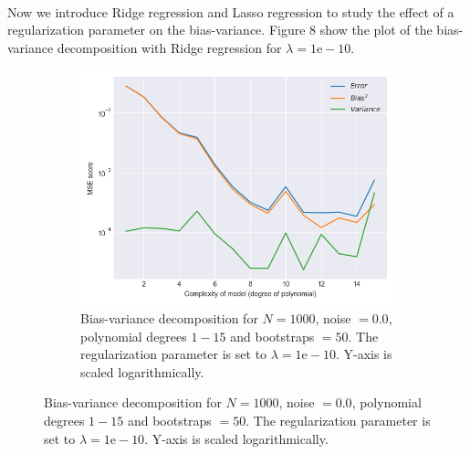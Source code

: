 \documentclass[a4paper,twocolumn]{article}
\begin{document}
\\
Now we introduce Ridge regression and Lasso regression to study the effect of a regularization parameter on the bias-variance. Figure 8 show the plot of the bias-variance decomposition with Ridge regression for $\lambda = 1\textrm{e}-10$.
\begin{figure}[ht]
    \centering
    \begin{subfigure}[b]{0.9\columnwidth}
        \includegraphics[width=\columnwidth]{bias_variance_tradeoff_Lambda=1e-10_Bootstraps=50_N=1000_Noise=0.0_Degree=1-15.png}
        \caption{Bias-variance decomposition for $N = 1000$, noise $= 0.0$, polynomial degrees $1- 15$ and bootstraps $= 50$. The regularization parameter is set to $\lambda = 1\textrm{e}-10$. Y-axis is scaled logarithmically.}
    \end{subfigure}
    

\end{figure}
\end{document}
